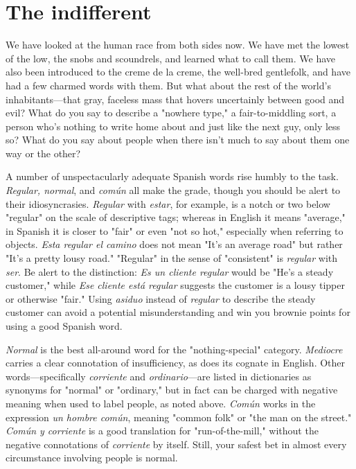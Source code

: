 \documentclass[14pt,a4paper,oneside]{memoir}
\begin{document}
\section{The indifferent}

We have looked at the human race from both sides now. We
have met the lowest of the low, the snobs and scoundrels, and learned
what to call them. We have also been introduced to the creme de la
creme, the well-bred gentlefolk, and have had a few charmed words
with them. But what about the rest of the world's inhabitants---that
gray, faceless mass that hovers uncertainly between good and evil?
What do you say to describe a "nowhere type," a fair-to-middling sort,
a person who's nothing to write home about and just like the next guy,
only less so? What do you say about people when there isn't much to
say about them one way or the other?

A number of unspectacularly adequate Spanish words rise
humbly to the task. \emph{Regular, normal}, and \emph{común} all make the grade,
though you should be alert to their idiosyncrasies. \emph{Regular} with \emph{estar},
for example, is a notch or two below "regular" on the scale of descriptive tags; whereas in English it means "average," in Spanish it is closer
to "fair" or even "not so hot," especially when referring to objects.
\emph{Esta regular el camino} does not mean "It's an average road" but rather
"It's a pretty lousy road." "Regular" in the sense of "consistent" is
\emph{regular} with \emph{ser}. Be alert to the distinction: \emph{Es un cliente regular}
would be "He's a steady customer," while \emph{Ese cliente está regular} suggests the customer is a lousy tipper or otherwise "fair." Using \emph{asiduo}
instead of \emph{regular} to describe the steady customer can avoid a potential
misunderstanding and win you brownie points for using a good Spanish word.

\emph{Normal} is the best all-around word for the "nothing-special"
category. \emph{Mediocre} carries a clear connotation of insufficiency, as does
its cognate in English. Other words---specifically \emph{corriente} and \emph{ordinario}---are listed in dictionaries as synonyms for "normal" or "ordinary,"
but in fact can be charged with negative meaning when used to label
people, as noted above. \emph{Común} works in the expression \emph{un hombre común}, meaning "common folk" or "the man on the street." \emph{Común y
	corriente} is a good translation for "run-of-the-mill," without the negative connotations of \emph{corriente} by itself. Still, your safest bet in almost
every circumstance involving people is normal.
\end{document}
